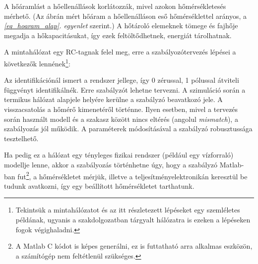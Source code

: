 A hőáramlást a hőellenállások korlátozzák, mivel azokon hőmérsékletesés mérhető. (Az ábrán mért hőáram a hőellenálláson eső hőmérséklettel arányos, a \textit{\ref{eq_hoaram_alap}. egyenlet} szerint.) A hőtároló elemeknek tömege és fajhője megadja a hőkapacitásukat, így ezek feltöltődhetnek, energiát tárolhatnak.


A mintahálózat egy RC-tagnak felel meg, erre a szabályozótervezés lépései a következők lennének\footnote{Tekintsük a mintahálózatot és az itt részletezett lépéseket egy szemléletes példának, ugyanis a szakdolgozatban tárgyalt hálózatra is ezeken a lépéseken fogok végighaladni.}:

Az identifikációnál ismert a rendszer jellege, így 0 zérussal, 1 pólussal átviteli függvényt identifikálnék.
Erre szabályzót lehetne tervezni. A szimuláció során a termikus hálózat alapjele helyére kerülne a szabályzó beavatkozó jele. A visszacsatolás a hőmérő kimenetéről történne. Ilyen esetben, mivel a tervezés során használt modell és a  szakasz között nincs eltérés (angolul \textit{mismatch}), a szabályozás jól működik.
A paraméterek módosításával a szabályzó robusztussága tesztelhető.

Ha pedig ez a hálózat egy tényleges fizikai rendszer (például egy vízforraló) modellje lenne, akkor a szabályozás történhetne úgy, hogy a szabályzó Matlab-ban fut\footnote{A Matlab C kódot is képes generálni, ez is futtatható arra alkalmas eszközön, a számítógép nem feltétlenül szükséges.}, a hőmérsékletet mérjük, illetve a teljesítményelektronikán keresztül be tudunk avatkozni, így egy beállított hőmérsékletet tarthatunk.

